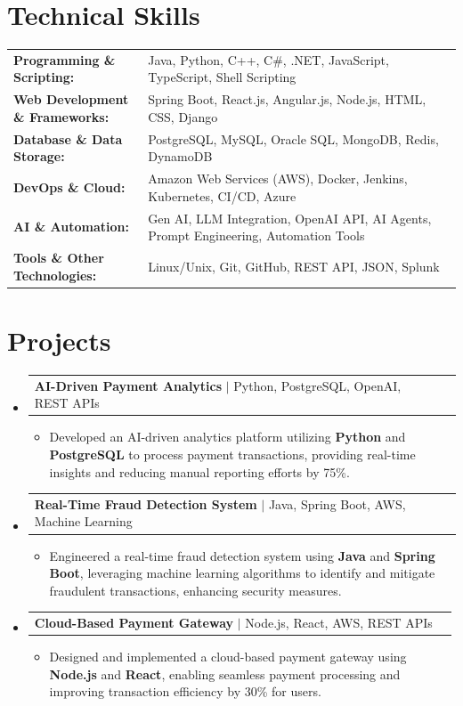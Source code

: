 \documentclass[letterpaper,10pt]{article}
\makeatletter
\newcommand{\resumeItem}[1]{
  \item{\fontsize{8pt}{9pt}\selectfont
    #1 \vspace{-3pt}
  }
}
\newcommand{\resumeProjectHeading}[2]{
    \item
    \begin{tabular*}{1.001\textwidth}{l@{\extracolsep{\fill}}r}
      \fontsize{8.5pt}{10pt}#1 & \textbf{\fontsize{8.5pt}{10pt} #2}\\
    \end{tabular*}\vspace{-7pt}
}
\newcommand{\resumeSubHeadingListStart}{\begin{itemize}[leftmargin=0pt, label={}]}
\newcommand{\resumeSubHeadingListEnd}{\end{itemize}}
\newcommand{\resumeItemListStart}{\begin{itemize}[leftmargin=*]}
\newcommand{\resumeItemListEnd}{\end{itemize}\vspace{-5pt}}
\makeatother
\begin{document}
\section{Technical Skills}
        \vspace{-14pt}
        \begin{table}[h]
            \fontsize{8pt}{9pt}\selectfont
            \begin{tabular}{p{0.3\linewidth} p{0.7\linewidth}}
                \textbf{Programming \& Scripting:} & Java, Python, C++, C#, .NET, JavaScript, TypeScript, Shell Scripting \\
                \textbf{Web Development \& Frameworks:} & Spring Boot, React.js, Angular.js, Node.js, HTML, CSS, Django \\
                \textbf{Database \& Data Storage:} & PostgreSQL, MySQL, Oracle SQL, MongoDB, Redis, DynamoDB \\
                \textbf{DevOps \& Cloud:} & Amazon Web Services (AWS), Docker, Jenkins, Kubernetes, CI/CD, Azure \\
                \textbf{AI \& Automation:} & Gen AI, LLM Integration, OpenAI API, AI Agents, Prompt Engineering, Automation Tools \\
                \textbf{Tools \& Other Technologies:} & Linux/Unix, Git, GitHub, REST API, JSON, Splunk \\
            \end{tabular}
        \end{table}
 \vspace{-18pt}

\section{Projects}
    \vspace{-5pt}
    \resumeSubHeadingListStart
          \resumeProjectHeading
            {\textbf{AI-Driven Payment Analytics} $|$ Python, PostgreSQL, OpenAI, REST APIs}{}
            \resumeItemListStart
                \resumeItem{Developed an AI-driven analytics platform utilizing \textbf{Python} and \textbf{PostgreSQL} to process payment transactions, providing real-time insights and reducing manual reporting efforts by 75\%.}
            \resumeItemListEnd
        \vspace{-12pt}
    
        \resumeProjectHeading
            {\textbf{Real-Time Fraud Detection System} $|$ Java, Spring Boot, AWS, Machine Learning}{}
        \resumeItemListStart
                \resumeItem{Engineered a real-time fraud detection system using \textbf{Java} and \textbf{Spring Boot}, leveraging machine learning algorithms to identify and mitigate fraudulent transactions, enhancing security measures.}
        \resumeItemListEnd
      \vspace{-12pt}
      \resumeProjectHeading
        {\textbf{Cloud-Based Payment Gateway} $|$ Node.js, React, AWS, REST APIs}{}
    \resumeItemListStart
            \resumeItem{Designed and implemented a cloud-based payment gateway using \textbf{Node.js} and \textbf{React}, enabling seamless payment processing and improving transaction efficiency by 30\% for users.}
    \resumeItemListEnd
    \resumeSubHeadingListEnd
\end{document}
